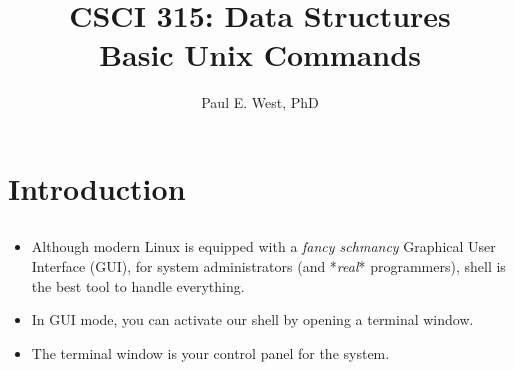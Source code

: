 \documentclass{beamer}
\title{CSCI 315: Data Structures \\ 
    Basic Unix Commands
}
\author{Paul E. West, PhD}
\institute{
  Department of Computer Science\\
  Charleston Southern University
}
\begin{document}
\begin{frame}
  \titlepage
\end{frame}


\section{Introduction}
\subsection{}
\begin{frame}{}
\begin{itemize}
\item Although modern Linux is equipped with a \textit{fancy schmancy} Graphical User Interface (GUI), for system administrators (and *\textit{real}* programmers), shell is the best tool to handle everything.
\item In GUI mode, you can activate our shell by opening a terminal window.
\item The terminal window is your control panel for the system.
\end{itemize}
\end{frame}
\end{document}
